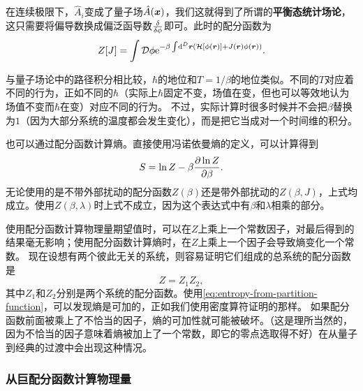 \documentclass[hyperref, UTF8, a4paper]{ctexart}
\newcommand*{\ee}{\mathrm{e}}
\newcommand*{\fd}[1]{\mathcal{D}{#1}}
\begin{document}
在连续极限下，$\hat{A}_i$变成了量子场$\hat{A}(\vb*{x})$，我们这就得到了所谓的\textbf{平衡态统计场论}，这只需要将偏导数换成偏泛函导数$\fdv{\phi}$即可。此时的配分函数为
\begin{equation}
    Z[J] = \int \fd{\phi} \ee^{-\beta \int \dd[D]{\vb*{r}} (\mathcal{H}[\phi(\vb*{r})] + J(\vb*{r}) \phi(\vb*{r}))}.
    \label{eq:path-integral-equilibrium}
\end{equation}

与量子场论中的路径积分相比较，$\hbar$的地位和$T=1/\beta$的地位类似。不同的$T$对应着不同的行为，正如不同的$\hbar$（实际上$\hbar$固定不变，场值在变，但也可以等效地认为场值不变而$\hbar$在变）对应不同的行为。
不过，实际计算时很多时候并不会把$\beta$替换为$1$（因为大部分系统的温度都会发生变化），而是把它当成对一个时间维的积分。

也可以通过配分函数计算熵。直接使用冯诺依曼熵的定义，可以计算得到
\begin{equation}
    S = \ln Z - \beta \pdv{\ln Z}{\beta}.
    \label{eq:entropy-from-partition-function}
\end{equation}
无论使用的是不带外部扰动的配分函数$Z(\beta)$还是带外部扰动的$Z(\beta, J)$，上式均成立。使用$Z(\beta, \lambda)$时上式不成立，因为这个表达式中有$\beta$和$\lambda$相乘的部分。

使用配分函数计算物理量期望值时，可以在$Z$上乘上一个常数因子，对最后得到的结果毫无影响；使用配分函数计算熵时，在$Z$上乘上一个因子会导致熵变化一个常数。
现在设想有两个彼此无关的系统，则容易证明它们组成的总系统的配分函数是
\begin{equation}
    Z = Z_1 Z_2,
\end{equation}
其中$Z_1$和$Z_2$分别是两个系统的配分函数。使用\eqref{eq:entropy-from-partition-function}，可以发现熵是可加的，正如我们使用密度算符证明的那样。
如果配分函数前面被乘上了不恰当的因子，熵的可加性就可能被破坏。（这是理所当然的，因为不恰当的因子意味着熵被加上了一个常数，即它的零点选取得不好）在从量子到经典的过渡中会出现这种情况。

\subsubsection{从巨配分函数计算物理量}
\end{document}
